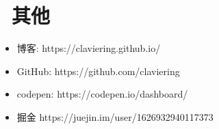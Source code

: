 \documentclass{resume}
\begin{document}


\section{\faInfo\ 其他}
\begin{itemize}[parsep=0.5ex]
  \item 博客: https://claviering.github.io/
  \item GitHub: https://github.com/claviering
  \item codepen: https://codepen.io/dashboard/
  \item 掘金 https://juejin.im/user/1626932940117373
\end{itemize}

%
%
\end{document}
